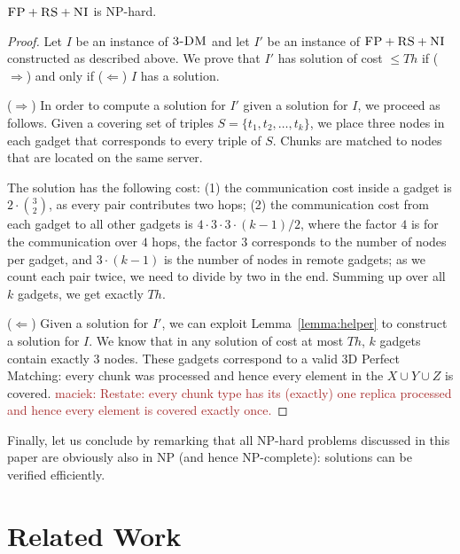 \documentclass[9pt]{sigcomm-alternate}
\newcommand{\maciek}[1]{\textcolor{brown}{maciek: #1}}
\newcommand{\CC}{\textsc{NI}}
\newcommand{\FP}{\textsc{FP}}
\newcommand{\RS}{\textsc{RS}}
\newcommand{\TDM}{\textsc{3-DM}}
\newcommand{\Thr}{\ensuremath{Th}}
\begin{document}
\begin{theorem}
$\FP+\RS+\CC$ is NP-hard.
\end{theorem}
\begin{proof}
Let $I$ be an instance of $\TDM$ and let $I'$ be an instance of
$\FP+\RS+\CC$ constructed as described above.
We prove that $I'$ has solution of cost $\leq \Thr$ if ($\Rightarrow$) and only if
($\Leftarrow$)
$I$ has a solution.

($\Rightarrow$) In order to compute a solution
for $I'$ given a solution for $I$, we proceed as follows.
Given a covering set of triples $S = \{t_1, t_2, \ldots, t_k\}$, we place three nodes in each gadget that
corresponds to every triple of $S$. Chunks are matched to nodes that are located
on the same server.

The solution has the following cost:
(1) the communication cost inside a gadget is $2 \cdot {3 \choose 2}$,
  as every pair contributes two hops;
  (2) the communication cost from each gadget to all other gadgets is $4
  \cdot 3 \cdot 3 \cdot (k - 1) / 2$, where the factor $4$ is
  for the
  communication over $4$ hops, the factor $3$
  corresponds to the number of nodes per gadget, and
  $3 \cdot (k-1)$ is the number of nodes in remote gadgets;
  as we count each pair twice, we need to divide by two in the end.
Summing up over all $k$ gadgets, we get exactly $\Thr$.

($\Leftarrow$) Given a solution for $I'$,
we can exploit Lemma~\ref{lemma:helper} to construct a solution for $I$.
We know that in any solution of cost at most $\Thr$,
$k$ gadgets contain exactly 3 nodes. These gadgets correspond to a valid
3D Perfect Matching: every
chunk was processed and hence every element in the $X \cup Y \cup Z$ is covered. \maciek{Restate: every chunk type has its (exactly) one replica processed and hence every element is covered exactly once.}
\end{proof}

Finally, let us conclude by remarking that all NP-hard problems discussed in this paper
are obviously also in NP (and hence NP-complete): solutions can be verified efficiently.

\section{Related Work}\label{sec:relwork}
\end{document}
